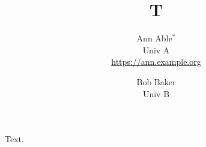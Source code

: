 \documentclass{article}
\title{T}
\author{Ann Able$^{*}$ \\ Univ A \\ \url{https://ann.example.org} \and Bob Baker \\ Univ B}
\begin{document}
\maketitle
Text.
\end{document}
